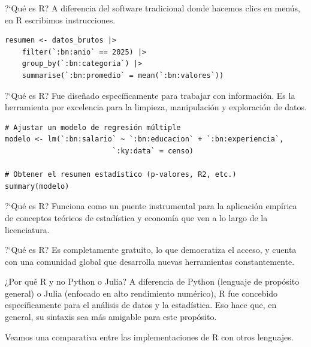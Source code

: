 \documentclass[8pt]{beamer}
\begin{document}
	\subtitle{Presentaci\'on de la materia}
	
	\begin{frame}[plain]
		\maketitle
	\end{frame}
	
	\begin{frame}[fragile]{?`Qu\'e es R?}
		 A diferencia del software tradicional donde hacemos clics en menús, en R escribimos instrucciones.
		 
\begin{lstlisting}[style=RScript]
resumen <- datos_brutos |>
	filter(`:bn:anio` == 2025) |>
	group_by(`:bn:categoria`) |>
	summarise(`:bn:promedio` = mean(`:bn:valores`))
\end{lstlisting}
	\end{frame}
	
	
	\begin{frame}[fragile]{?`Qu\'e es R?}
		Fue diseñado específicamente para trabajar con información. Es la herramienta por excelencia para la limpieza, manipulación y exploración de datos.
\begin{lstlisting}[style=RScript]
# Ajustar un modelo de regresión múltiple
modelo <- lm(`:bn:salario` ~ `:bn:educacion` + `:bn:experiencia`,
						 `:ky:data` = censo)

# Obtener el resumen estadístico (p-valores, R2, etc.)
summary(modelo)
\end{lstlisting}
	\end{frame}
	
	
	
	\begin{frame}[fragile]{?`Qu\'e es R?}
		Funciona como un puente instrumental para la aplicación empírica de conceptos teóricos de estadística y economía que ven a lo largo de la licenciatura.
	\end{frame}
	
	\begin{frame}[fragile]{?`Qu\'e es R?}
		Es completamente gratuito, lo que democratiza el acceso, y cuenta con una comunidad global que desarrolla nuevas herramientas constantemente.
\end{frame}

	
	\begin{frame}[fragile]{¿Por qué R y no Python o Julia?}
			A diferencia de Python (lenguaje de propósito general) o Julia (enfocado en alto rendimiento numérico), R fue concebido específicamente para el análisis de datos y la estadística. Eso hace que, en general, su sintaxis sea m\'as amigable  para este prop\'osito.
			
			Veamos una comparativa entre las implementaciones de R con otros lenguajes.
	\end{frame}
	
\end{document}

